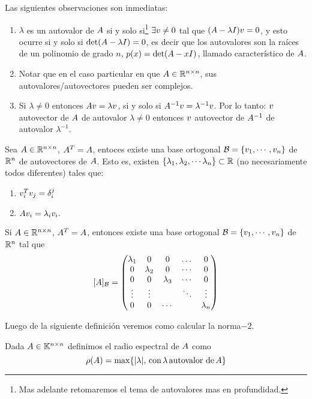 \etcc
\begin{rem}
\label{rem:sobreautovalores}Las siguientes observaciones son inmediatas:
\begin{enumerate}
\item $\lambda$ es un autovalor de $\Ab$ si y solo si\footnote{Mas adelante retomaremos el tema de autovalores mas en profundidad.} $\exists \vb\neq \cero$ tal que $(\Ab-\lambda\Ib)\vb=\cero$, y esto ocurre si y solo si $\det(\Ab-\lambda\Ib)=0$, es decir que los autovalores son la raíces de un polinomio de grado $n$, $p(x)=\det(\Ab-x\Ib)$, llamado característico de $\Ab$.

\item Notar que en el caso particular en que $\Ab\in \Rnn$, sus autovalores/autovectores pueden ser complejos.
\item Si $\lambda\neq 0$ entonces $\Ab\vb=\lambda \vb$, si y solo si  $\Ab^{-1}\vb=\lambda^{-1}\vb$. Por lo tanto: $\vb$ autovector de $\Ab$ de autovalor $\lambda\neq 0$ entonces $\vb$ autovector de $\Ab^{-1}$ de autovalor $\lambda^{-1}$.
\end{enumerate}


\end{rem}

\begin{prop}
 Sea $\Ab\in \Rnn$, $\Ab^T=\Ab$, entoces existe una base ortogonal $\mathcal{B}=\{\vb_1,\cdots,\vb_n\}$ de $\mathbb R^{n}$ de autovectores de $\Ab$. Esto es, existen $\{\lambda_1, \lambda_2,\cdots \lambda_n\}\subset \mathbb R$ (no necesariamente todos diferentes) tales que:
 \begin{enumerate}
  \item $\vb_i^T\vb_j=\delta_i^j$
  \item $\Ab\vb_i=\lambda_i\vb_i.$
 \end{enumerate}
\end{prop}
\begin{cor}
 Si $\Ab\in \Rnn$, $\Ab^T=\Ab$, entonces existe una base ortogonal $\mathcal{B}=\{\vb_1,\cdots,\vb_n\}$ de $\mathbb R^{n}$ tal que
 $$[\Ab]_{\mathcal{B}}=
 \begin{pmatrix}
  \lambda_1&0&0&\dots&0\\
  0&\lambda_2&0&\cdots &0 \\
  0&0&\lambda_3 &\cdots&0 \\
  \vdots&\vdots & &\ddots&\vdots\\
  0&0&\cdots &&\lambda_n
 \end{pmatrix}
 $$
\end{cor}
Luego de la siguiente definición veremos como calcular la norma$-2$.
\tccdefi
\begin{defi}
 Dada $\Ab\in \Knn$ definimos el radio espectral de $\Ab$ como
 $$
 \rho(\Ab)=\max\{|\lambda|, \, \mbox{con}\, \lambda \,\mbox{autovalor de}\, \Ab\}
 $$
\end{defi}

